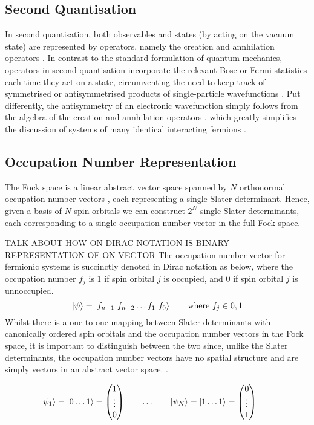 \subsection{Second Quantisation}
In second quantisation, both observables and states (by acting on the vacuum state) are represented by operators, namely the creation and annhilation operators \cite{Helgaker2000}. In contrast to the standard formulation of quantum mechanics, operators in second quantisation incorporate the relevant Bose or Fermi statistics each time they act on a state, circumventing the need to keep track of symmetrised or antisymmetrised products of single-particle wavefunctions \cite{Fetter1972}. Put differently, the antisymmetry of an electronic wavefunction simply follows from the algebra of the creation and annhilation operators \cite{Helgaker2000}, which greatly simplifies the discussion of systems of many identical interacting fermions \cite{Fetter1972}.

\subsection{Occupation Number Representation}
The Fock space is a linear abstract vector space spanned by $N$ orthonormal occupation number vectors \cite{Helgaker2000}, each representing a single Slater determinant. Hence, given a basis of $N$ spin orbitals we can construct $2^N$ single Slater determinants, each corresponding to a single occupation number vector in the full Fock space.

TALK ABOUT HOW ON DIRAC NOTATION IS BINARY REPRESENTATION OF ON VECTOR
The occupation number vector for fermionic systems is succinctly denoted in Dirac notation as below, where the occupation number $f_j$ is 1 if spin orbital $j$ is occupied, and 0 if spin orbital $j$ is unnoccupied.
\begin{equation*}
    \ket\psi = \ket{f_{n-1} \,\, f_{n-2} \dots f_{1} \,\, f_{0}} \qquad \text{where } f_{j} \in {0, 1}
\end{equation*}
Whilst there is a one-to-one mapping between Slater determinants with canonically ordered spin orbitals and the occupation number vectors in the Fock space, it is important to distinguish between the two since, unlike the Slater determinants, the occupation number vectors have no spatial structure and are simply vectors in an abstract vector space. \cite{Helgaker2000}.

\begin{equation*}
    \ket{\psi_1} = \ket{0 \dots 1} =
    \begin{pmatrix} 1 \\ \vdots \\ 0 \end{pmatrix} \qquad
    \dots\qquad
    \ket{\psi_N} = \ket{1 \dots 1} =
    \begin{pmatrix} 0 \\ \vdots \\ 1 \end{pmatrix} \qquad
\end{equation*}

